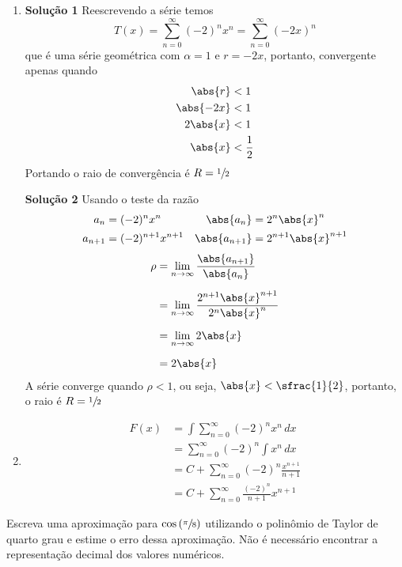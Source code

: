 \documentclass[a4paper,12pt,fleqn]{article}
\begin{document}
\begin{answer}
\begin{enumerate}[label=\alph*)]
\item
  \textbf{Solução 1}
  Reescrevendo a série temos
  \[
    T(x)
    = \sum_{n=0}^\infty (-2)^n x^n
    = \sum_{n=0}^\infty (-2x)^n
  \]
  que é uma série geométrica com \(\alpha = 1\) e \(r = -2x\),
  portanto, convergente apenas quando
  \begin{align*}
    \abs{r} & < 1 \\
    \abs{-2x} & < 1 \\
    2\abs{x} & < 1 \\
    \abs{x} & < \frac{1}{2}
  \end{align*}
  Portando o raio de convergência é \(R=\sfrac{1}{2}\)

  \textbf{Solução 2}
  Usando o teste da razão
  \begin{align*}
    a_n     & = (-2)^n x^n         & \abs{a_n}     & = 2^n\abs{x}^n         \\
    a_{n+1} & = (-2)^{n+1} x^{n+1} & \abs{a_{n+1}} & = 2^{n+1}\abs{x}^{n+1}
  \end{align*}
  \begin{align*}
    \rho
    & = \lim_{n\to\infty} \frac{\abs{a_{n+1}}}{\abs{a_n}} \\[2mm]
    & = \lim_{n\to\infty} \frac{2^{n+1}\abs{x}^{n+1}}{2^n\abs{x}^n} \\[2mm]
    & = \lim_{n\to\infty} 2\abs{x} \\[2mm]
    & = 2\abs{x}
  \end{align*}
  A série converge quando \(\rho<1\), ou seja, \(\abs{x}<\sfrac{1}{2}\),
  portanto, o raio é  \(R=\sfrac{1}{2}\)

\item
  \begin{align*}
    F(x)
    & = \int \sum_{n=0}^\infty (-2)^n x^n \,dx \\[2mm]
    & = \sum_{n=0}^\infty (-2)^n \int x^n \,dx \\[2mm]
    & = C + \sum_{n=0}^\infty (-2)^n \frac{x^{n+1}}{n+1} \\[2mm]
    & = C + \sum_{n=0}^\infty \frac{(-2)^n}{n+1}x^{n+1}
  \end{align*}
\end{enumerate}
\end{answer}



Escreva uma aproximação para \(\cos\left(\sfrac{\pi}{8}\right)\)
utilizando o polinômio de Taylor de quarto grau e
estime o erro dessa aproximação.
Não é necessário encontrar a representação decimal dos valores numéricos.
\end{document}
